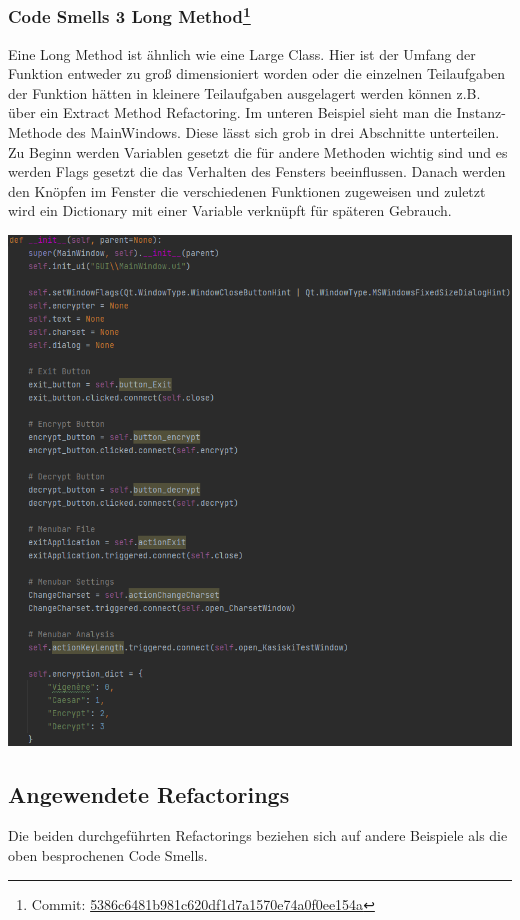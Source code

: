 \documentclass[12pt]{article}
\begin{document}
\subsubsection[Code Smells 3 Long Method]{Code Smells 3 Long Method\protect\footnote{Commit: \href{https://github.com/NicoSchrodt/EncryptionService/commit/5386c6481b981c620df1d7a1570e74a0f0ee154a}{5386c6481b981c620df1d7a1570e74a0f0ee154a}}}
Eine Long Method ist ähnlich wie eine Large Class. Hier ist der Umfang der Funktion entweder zu groß dimensioniert worden oder die einzelnen Teilaufgaben der Funktion hätten in kleinere Teilaufgaben ausgelagert werden können z.B. über ein Extract Method Refactoring. Im unteren Beispiel sieht man die Instanz-Methode des MainWindows. Diese lässt sich grob in drei Abschnitte unterteilen. Zu Beginn werden Variablen gesetzt die für andere Methoden wichtig sind und es werden Flags gesetzt die das Verhalten des Fensters beeinflussen. Danach werden den Knöpfen im Fenster die verschiedenen Funktionen zugeweisen und zuletzt wird ein Dictionary mit einer Variable verknüpft für späteren Gebrauch.
\begin{center}
	\includegraphics[width=15cm]{bilder/CodeSmells2.png}
\end{center}

\subsection{Angewendete Refactorings}
Die beiden durchgeführten Refactorings beziehen sich auf andere Beispiele als die oben besprochenen Code Smells.
\end{document}
